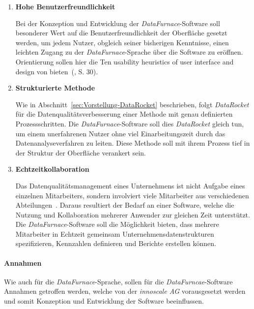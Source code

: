 \documentclass[
  language=german, %
  type=bachelor%
]{isthesis}
\begin{document}
\begin{content}
\begin{enumerate}
    \item \textbf{Hohe Benutzerfreundlichkeit}

      Bei der Konzeption und Entwicklung der \textit{DataFurnace}-Software soll
      besonderer Wert auf die Benutzerfreundlichkeit der Oberfläche gesetzt
      werden, um jedem Nutzer, obgleich seiner bisherigen Kenntnisse,  einen
      leichten Zugang zu der \textit{DataFurnace}-Sprache über die Software zu
      eröffnen. Orientierung sollen hier die \glqq{}Ten usability heuristics of
      user interface and design\grqq{} von
      \textsc{\citeauthor{nielsen1994heuristic}}
      bieten~(\citeyear{nielsen1994heuristic}, S. 30).

    \item \textbf{Strukturierte Methode}

      Wie in Abschnitt~\ref{sec:Vorstellung-DataRocket} beschrieben, folgt
      \textit{DataRocket} für die Datenqualitätsverbesserung einer Methode mit
      genau definierten Prozessschritten. Die \textit{DataFurnace}-Software
      soll dies \textit{DataRocket} gleich tun, um einem unerfahrenen Nutzer
      ohne viel Einarbeitungszeit durch das Datenanalyseverfahren zu leiten.
      Diese Methode soll mit ihrem Prozess tief in der Struktur der Oberfläche
      verankert sein.

    \item \textbf{Echtzeitkollaboration}

			Das Datenqualitätsmanagement eines Unternehmens ist nicht Aufgabe eines
			einzelnen Mitarbeiters, sondern involviert viele Mitarbeiter aus
			verschiedenen Abteilungen~\cite[][S. 2]{geiger2004data}. Daraus resultiert der
			Bedarf an einer Software, welche die Nutzung und Kollaboration mehrerer
			Anwender zur gleichen Zeit unterstützt. Die \textit{DataFurnace}-Software
			soll die Möglichkeit bieten, dass mehrere Mitarbeiter in Echtzeit gemeinsam
			Unternehmensdatenstrukturen spezifizieren, Kennzahlen
			definieren und Berichte erstellen können.
      
  \end{enumerate}


	\paragraph{Annahmen} Wie auch für die \textit{DataFurnace}-Sprache, sollen
	für die \textit{DataFurncae}-Software Annahmen getroffen werden, welche von der
	\textit{innoscale AG} vorausgesetzt werden und somit Konzeption und
	Entwicklung der Software beeinflussen.


\end{content}
\end{document}
